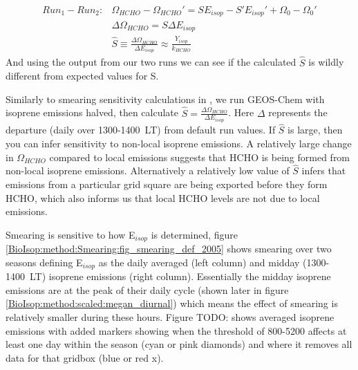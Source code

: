       \begin{eqnarray}
        \label{BioIsop:method:Smearing:calculation:eqn_hats}
        Run_1-Run_2 :& \Omega_{HCHO} - \Omega_{HCHO}' = S E_{isop} - S' E_{isop}' +\Omega_0 - \Omega_0' \\
        & \Delta \Omega_{HCHO} = S \Delta E_{isop} \\
        & \hat{S} \equiv \frac{\Delta{\Omega_{HCHO}}}{\Delta E_{isop}} \approx \frac{Y_{isop}}{k_{HCHO}}
      \end{eqnarray}
      And using the output from our two runs we can see if the calculated $\hat{S}$ is wildly different from expected values for S.
      
      
      Similarly to smearing sensitivity calculations in \textcite{Marais2012}, we run GEOS-Chem with isoprene emissions halved, then calculate $\hat{S} = \frac{\Delta \Omega_{HCHO}}{\Delta E_{isop}} $.
      Here $\Delta$ represents the departure (daily over 1300-1400~LT) from default run values.
      If $\hat{S}$ is large, then you can infer sensitivity to non-local isoprene emissions.
      A relatively large change in $\Omega_{HCHO}$ compared to local emissions suggests that HCHO is being formed from non-local isoprene emissions.
      Alternatively a relatively low value of $\hat{S}$ infers that emissions from a particular grid square are being exported before they form HCHO, which also informs us that local HCHO levels are not due to local emissions.
      
      Smearing is sensitive to how E$_{isop}$ is determined, figure \ref{BioIsop:method:Smearing:fig_smearing_def_2005} shows smearing over two seasons defining E$_{isop}$ as the daily averaged (left column) and midday (1300-1400~LT) isoprene emissions (right column). 
      Essentially the midday isoprene emissions are at the peak of their daily cycle (shown later in figure \ref{BioIsop:method:scaled:megan_diurnal}) which means the effect of smearing is relatively smaller during these hours.
      Figure TODO: shows averaged isoprene emissions with added markers showing when the threshold of 800-5200 affects at least one day within the season (cyan or pink diamonds) and where it removes all data for that gridbox (blue or red x).
      
      
      
